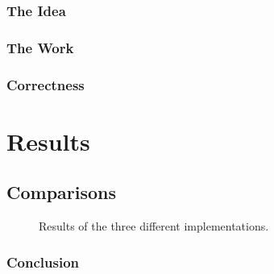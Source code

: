 \documentclass[]{report}
\begin{document}
\subsubsection{The Idea}
\subsubsection{The Work}
\subsubsection{Correctness}

\section{Results}
\subsection{Comparisons}
\begin{figure}[h]
\caption{\label{fig:results} Results of the three different implementations.}
\end{figure}
\subsubsection{Conclusion}
\end{document}

